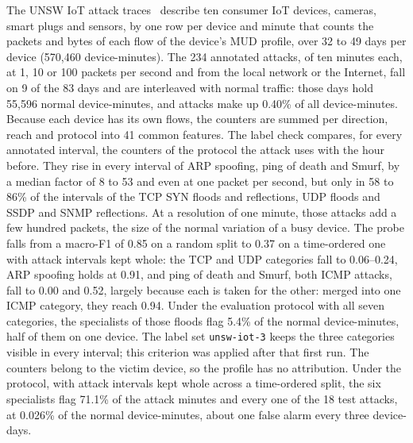 The UNSW IoT attack traces~\cite{hamza2019unsw} describe ten consumer IoT devices, cameras,
smart plugs and sensors, by one row per device and minute that counts the packets and
bytes of each flow of the device's MUD profile, over 32 to 49 days per device (570{,}460
device-minutes). The 234 annotated attacks, of ten minutes each, at 1, 10 or 100 packets
per second and from the local network or the Internet, fall on 9 of the 83 days and are
interleaved with normal traffic: those days hold 55{,}596 normal device-minutes, and
attacks make up 0.40\% of all device-minutes. Because each device has its own flows, the
counters are summed per direction, reach and protocol into 41 common features. The label
check compares, for every annotated interval, the counters of the protocol the attack uses
with the hour before. They rise in every interval of ARP spoofing, ping of death and Smurf,
by a median factor of 8 to 53 and even at one packet per second, but only in 58 to 86\% of
the intervals of the TCP SYN floods and reflections, UDP floods and SSDP and SNMP
reflections. At a resolution of one minute, those attacks add a few hundred packets, the
size of the normal variation of a busy device. The probe falls from a macro-F1 of 0.85 on
a random split to 0.37 on a time-ordered one with attack intervals kept whole: the TCP and
UDP categories fall to 0.06--0.24, ARP spoofing holds at 0.91, and ping of death and
Smurf, both ICMP attacks, fall to 0.00 and 0.52, largely because each is taken for the
other: merged into one ICMP category, they reach 0.94. Under the evaluation protocol with all
seven categories, the specialists of those floods flag 5.4\% of the normal device-minutes,
half of them on one device. The label set \texttt{unsw-iot-3} keeps the three categories
visible in every interval; this criterion was applied after that first run. The counters
belong to the victim device, so the profile has no attribution. Under the protocol, with
attack intervals kept whole across a time-ordered split, the six specialists flag 71.1\%
of the attack minutes and every one of the 18 test attacks, at 0.026\% of the normal
device-minutes, about one false alarm every three device-days.
